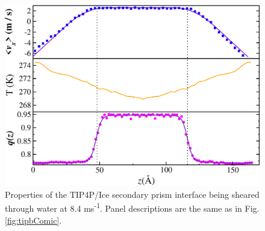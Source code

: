 \begin{figure}
\includegraphics[width=\linewidth]{Figures/SecPrism_TIP4PIce_Plot}
\caption{\label{fig:tipsComic} Properties of the TIP4P/Ice secondary
  prism interface being sheared through water at 8.4
  ms\textsuperscript{-1}.  Panel descriptions are the same as in
  Fig. \ref{fig:tipbComic}.}
\end{figure}
